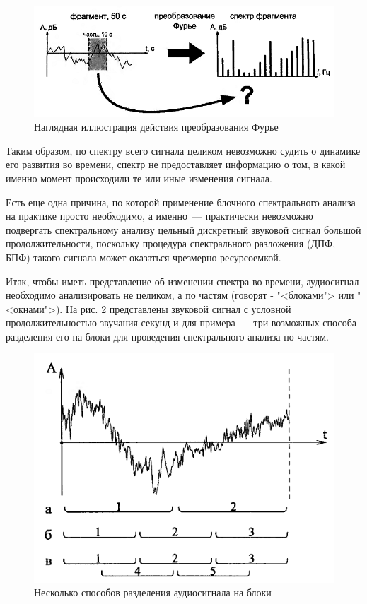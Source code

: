 \documentclass[oneside, final, 14pt]{extreport}
\begin{document}
\begin{figure}[h]
\centering
\includegraphics{pic-specter-10}
\caption{Наглядная иллюстрация действия преобразования Фурье}
\label{pic-specter-10}
\end{figure}

Таким образом, по спектру всего сигнала целиком невозможно судить о динамике его развития во времени, спектр не предоставляет информацию о том, в какой именно момент происходили те или иные изменения сигнала.

Есть еще одна причина, по которой применение блочного спектрального анализа на практике просто необходимо, а именно~--- практически невозможно подвергать спектральному анализу цельный дискретный звуковой сигнал большой продолжительности, поскольку процедура спектрального разложения (ДПФ, БПФ) такого сигнала может оказаться чрезмерно ресурсоемкой.

Итак, чтобы иметь представление об изменении спектра во времени, аудиосигнал необходимо анализировать не целиком, а по частям (говорят - "<блоками"> или "<окнами">). На рис. \ref{pic-specter-11} представлены звуковой сигнал с условной продолжительностью звучания секунд и для примера~--- три возможных способа разделения его на блоки для проведения спектрального анализа по частям.

\begin{figure}[h]
\centering
\includegraphics{pic-specter-11}
\caption{Несколько способов разделения аудиосигнала на блоки}
\label{pic-specter-11}
\end{figure}
\end{document}
